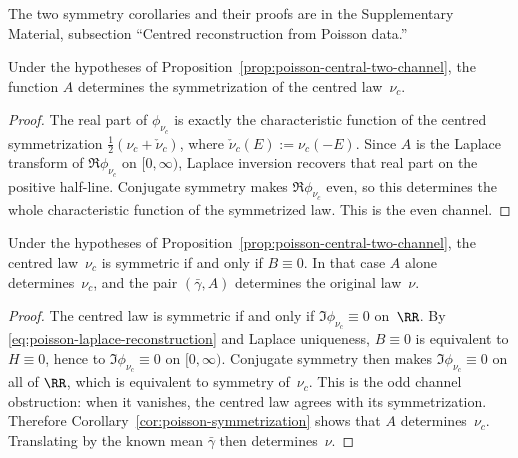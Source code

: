 \ifdefined\JFAArticleMain
The two symmetry corollaries and their proofs are in the Supplementary
Material, subsection ``Centred reconstruction from Poisson data.''
\else
\begin{corollary}%
\label{cor:poisson-symmetrization}
Under the hypotheses of Proposition~\ref{prop:poisson-central-two-channel}, the
function $A$ determines the symmetrization of the centred law~$\nu_c$.
\end{corollary}

\begin{proof}
The real part of $\phi_{\nu_c}$ is exactly the characteristic function of
the centred symmetrization
$\frac12(\nu_c+\check\nu_c)$, where $\check\nu_c(E):=\nu_c(-E)$.  Since
$A$ is the Laplace transform of $\Re\phi_{\nu_c}$ on $[0,\infty)$, Laplace
inversion recovers that real part on the positive half-line.  Conjugate
symmetry makes $\Re\phi_{\nu_c}$ even, so this determines the whole
characteristic function of the symmetrized law.  This is the even channel.
\end{proof}

\begin{corollary}%
\label{cor:poisson-symmetric-case}
Under the hypotheses of Proposition~\ref{prop:poisson-central-two-channel}, the
centred law~$\nu_c$ is symmetric if and only if $B\equiv 0$.  In that case
$A$ alone determines~$\nu_c$, and the pair $(\bar{\gamma},A)$ determines the
original law~$\nu$.
\end{corollary}

\begin{proof}
The centred law is symmetric if and only if
$\Im\phi_{\nu_c}\equiv 0$ on~$\RR$.  By
\eqref{eq:poisson-laplace-reconstruction} and Laplace uniqueness,
\(B\equiv0\) is equivalent to \(H\equiv0\), hence to
\(\Im\phi_{\nu_c}\equiv0\) on \([0,\infty)\).  Conjugate symmetry then makes
\(\Im\phi_{\nu_c}\equiv0\) on all of \(\RR\), which is equivalent to
symmetry of~\(\nu_c\).  This is the odd channel obstruction: when it
vanishes, the centred law agrees with its symmetrization.  Therefore
Corollary~\ref{cor:poisson-symmetrization} shows that $A$ determines~$\nu_c$.
Translating by the known mean $\bar{\gamma}$ then determines~$\nu$.
\end{proof}
\fi

